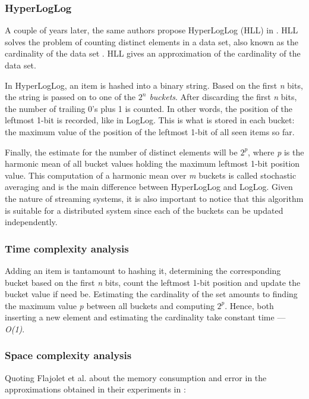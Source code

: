 \subsubsection{HyperLogLog}
A couple of years later, the same authors propose HyperLogLog (HLL) in \cite{Flajolet-HLL}. HLL solves the problem of counting distinct elements in a data set, also known as the cardinality of the data set \cite{Flajolet-HLL}. HLL gives an approximation of the cardinality of the data set. 

In HyperLogLog, an item is hashed into a binary string. Based on the first \textit{n} bits, the string is passed on to one of the \textit{$2^n$ buckets}. After discarding the first \textit{n} bits, the number of trailing 0's plus 1 is counted. In other words, the position of the leftmost 1-bit is recorded, like in LogLog. This is what is stored in each bucket: the maximum value of the position of the leftmost 1-bit of all seen items so far. 


Finally, the estimate for the number of distinct elements will be $2^p$, where \textit{p} is the harmonic mean of all bucket values holding the maximum leftmost 1-bit position value. This computation of a harmonic mean over \textit{m} buckets is called stochastic averaging and is the main difference between HyperLogLog and LogLog. Given the nature of streaming systems, it is also important to notice that this algorithm is suitable for a distributed system since each of the buckets can be updated independently.

\subsubsection*{Time complexity analysis}
Adding an item is tantamount to hashing it, determining the corresponding bucket based on the first \textit{n} bits, count the leftmost 1-bit position and update the bucket value if need be. Estimating the cardinality of the set amounts to finding the maximum value \textit{p} between all buckets and computing $2^p$. Hence, both inserting a new element and estimating the cardinality take constant time --- \textit{O(1)}.

\subsubsection*{Space complexity analysis}
Quoting Flajolet et al. about the memory consumption and error in the approximations obtained in their experiments in  \cite{Flajolet-HLL}: 

